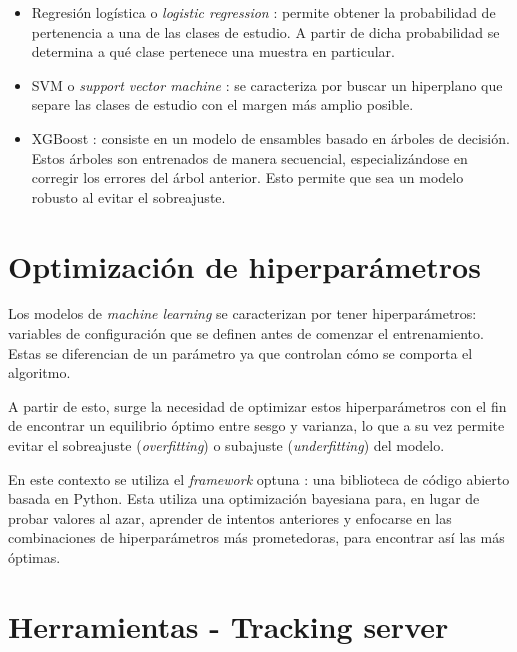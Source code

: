 \begin{itemize}
    \item Regresión logística o \textit{logistic regression} \citep{model:lr}: permite obtener la probabilidad de pertenencia a una de las clases de estudio. A partir de dicha probabilidad se determina a qué clase pertenece una muestra en particular.
    \item SVM o \textit{support vector machine} \citep{model:svm}: se caracteriza por buscar un hiperplano que separe las clases de estudio con el margen más amplio posible.
    \item XGBoost \citep{model:xgboost}: consiste en un modelo de ensambles basado en árboles de decisión. Estos árboles son entrenados de manera secuencial, especializándose en corregir los errores del árbol anterior. Esto permite que sea un modelo robusto al evitar el sobreajuste.
\end{itemize}

\section{Optimización de hiperparámetros}

Los modelos de \textit{machine learning} se caracterizan por tener hiperparámetros: variables de configuración que se definen antes de comenzar el entrenamiento. Estas se diferencian de un parámetro ya que controlan cómo se comporta el algoritmo.

A partir de esto, surge la necesidad de optimizar estos hiperparámetros con el fin de encontrar un equilibrio óptimo entre sesgo y varianza, lo que a su vez permite evitar el sobreajuste (\textit{overfitting}) o subajuste (\textit{underfitting}) del modelo.

En este contexto se utiliza el \textit{framework} optuna \citep{WEBSITE:optuna}: una biblioteca de código abierto basada en Python. Esta utiliza una optimización bayesiana para, en lugar de probar valores al azar, aprender de intentos anteriores y enfocarse en las combinaciones de hiperparámetros más prometedoras, para encontrar así las más óptimas.

\section{Herramientas - Tracking server}

